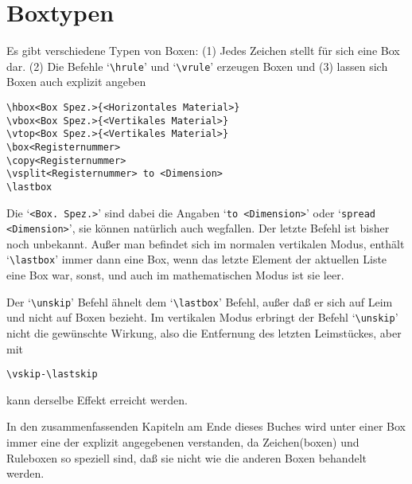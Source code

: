\section{Boxtypen}
Es gibt verschiedene Typen von Boxen: (1) Jedes Zeichen stellt f\"ur sich
eine Box dar. (2) Die Befehle `\verb|\hrule|' und `\verb|\vrule|'
erzeugen Boxen und (3) lassen sich Boxen auch explizit angeben
\begin{verbatim}
\hbox<Box Spez.>{<Horizontales Material>}
\vbox<Box Spez.>{<Vertikales Material>}
\vtop<Box Spez.>{<Vertikales Material>}
\box<Registernummer>
\copy<Registernummer>
\vsplit<Registernummer> to <Dimension>
\lastbox
\end{verbatim}
Die `\verb|<Box. Spez.>|' sind dabei die Angaben 
`\verb|to <Dimension>|'
oder `\verb|spread <Dimension>|', sie k\"onnen nat\"urlich
auch wegfallen. Der letzte Befehl ist bisher noch unbekannt. Au\ss{}er man
befindet sich im normalen vertikalen Modus, enth\"alt `\verb|\lastbox|'
immer dann eine Box, wenn das letzte Element der aktuellen Liste eine
Box war, sonst, und auch im mathematischen Modus ist sie leer.

Der 
`\verb|\unskip|' Befehl \"ahnelt dem `\verb|\lastbox|' Befehl, au\ss{}er
da\ss{} er sich auf 
Leim und nicht auf Boxen bezieht. Im vertikalen Modus
erbringt der Befehl `\verb|\unskip|' nicht die gew\"unschte Wirkung,
also die Entfernung des letzten Leimst\"uckes, aber mit
\begin{verbatim}
\vskip-\lastskip
\end{verbatim}
kann derselbe Effekt erreicht werden.

In den zusammenfassenden Kapiteln am Ende dieses Buches wird unter
einer Box immer eine der explizit angegebenen verstanden, da
Zeichen(boxen) und Ruleboxen so speziell sind, da\ss{} sie nicht wie die
anderen Boxen behandelt werden.

